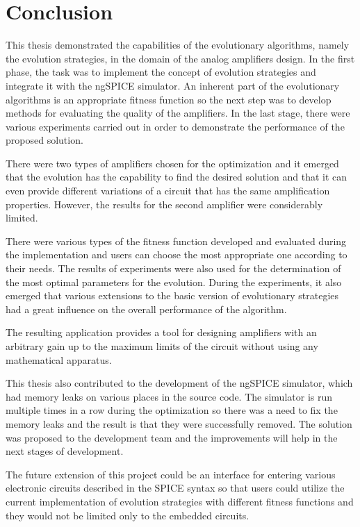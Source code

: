 \chapter{Conclusion}
This thesis demonstrated the capabilities of the evolutionary algorithms, namely the evolution strategies, in the domain of the analog amplifiers design. In the first phase, the task was to implement the concept of evolution strategies and integrate it with the ngSPICE simulator. An inherent part of the evolutionary algorithms is an appropriate fitness function so the next step was to develop methods for evaluating the quality of the amplifiers. In the last stage, there were various experiments carried out in order to demonstrate the performance of the proposed solution.

There were two types of amplifiers chosen for the optimization and it emerged that the evolution has the capability to find the desired solution and that it can even provide different variations of a circuit that has the same amplification properties. However, the results for the second amplifier were considerably limited.

There were various types of the fitness function developed and evaluated during the implementation and users can choose the most appropriate one according to their needs. The results of experiments were also used for the determination of the most optimal parameters for the evolution. During the experiments, it also emerged that various extensions to the basic version of evolutionary strategies had a great influence on the overall performance of the algorithm.

The resulting application provides a tool for designing amplifiers with an arbitrary gain up to the maximum limits of the circuit without using any mathematical apparatus.

This thesis also contributed to the development of the ngSPICE simulator, which had memory leaks on various places in the source code. The simulator is run multiple times in a row during the optimization so there was a need to fix the memory leaks and the result is that they were successfully removed. The solution was proposed to the development team and the improvements will help in the next stages of development.

The future extension of this project could be an interface for entering various electronic circuits described in the SPICE syntax so that users could utilize the current implementation of evolution strategies with different fitness functions and they would not be limited only to the embedded circuits.
